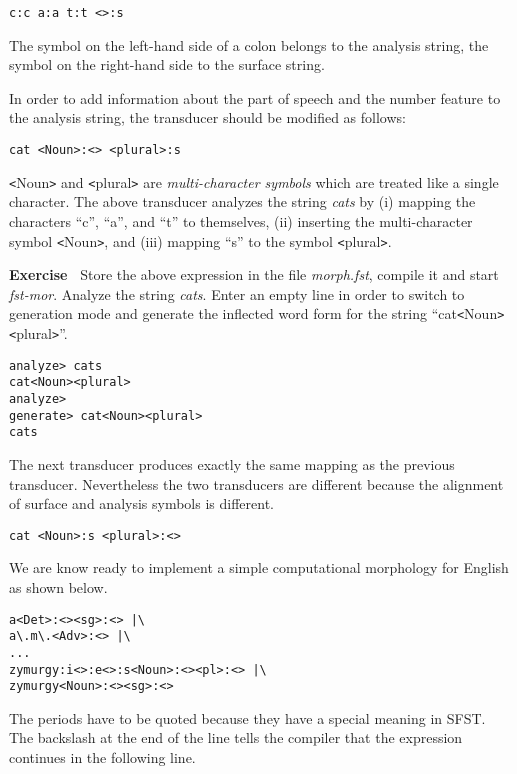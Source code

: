 \documentclass[11pt]{article}
\newenvironment{exercise}{

  \hrulefill\nopagebreak

  \textbf{Exercise~}}
{

  \nopagebreak\hrulefill\vspace{0.2cm}

}
\begin{document}
\begin{verbatim}
c:c a:a t:t <>:s
\end{verbatim}

The symbol on the left-hand side of a colon belongs to the analysis string,
the symbol on the right-hand side to the surface string.

In order to add information about the part of speech and the number
feature to the analysis string, the transducer should be modified as
follows:

\begin{verbatim}
cat <Noun>:<> <plural>:s
\end{verbatim}

\verb#<#Noun\verb#># and \verb#<#plural\verb#># are
\emph{multi-character symbols} which are treated like a single
character. The above transducer analyzes the string \emph{cats} by
(i) mapping the characters ``c'', ``a'', and ``t'' to themselves, (ii)
inserting the multi-character symbol \verb#<#Noun\verb#>#, and (iii)
mapping ``s'' to the symbol \verb#<#plural\verb#>#.

\begin{exercise}
  Store the above expression in the file \emph{morph.fst}, compile it
  and start \emph{fst-mor}. Analyze the string \emph{cats}. Enter an
  empty line in order to switch to generation mode and generate the
  inflected word form for the string
  ``cat\verb#<#Noun\verb#>#\verb#<#plural\verb#>#''.
\begin{verbatim}
analyze> cats
cat<Noun><plural>
analyze> 
generate> cat<Noun><plural>
cats
\end{verbatim}
\end{exercise}

The next transducer produces exactly the same mapping as the
previous transducer. Nevertheless the two transducers are different
because the alignment of surface and analysis symbols is different.
\begin{verbatim}
cat <Noun>:s <plural>:<>
\end{verbatim}

We are know ready to implement a simple computational morphology for
English as shown below.

\begin{verbatim}
a<Det>:<><sg>:<> |\
a\.m\.<Adv>:<> |\
...
zymurgy:i<>:e<>:s<Noun>:<><pl>:<> |\
zymurgy<Noun>:<><sg>:<>
\end{verbatim}

The periods have to be quoted because they have a special
meaning in SFST. The backslash at the end of the line tells the
compiler that the expression continues in the following line.
\end{document}
